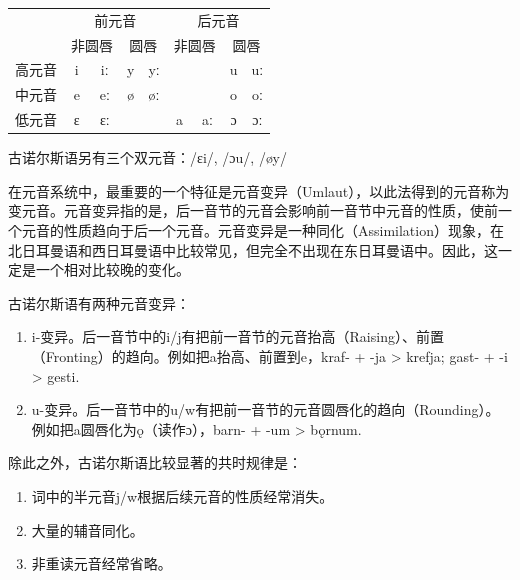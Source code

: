 \begin{table}[H]
    \centering
    \begin{tabular}{@{}ccccccccc@{}}
        \toprule
            & \multicolumn{4}{c}{前元音} & \multicolumn{4}{c}{后元音}                                                                      \\ \cmidrule(l){2-9}
            & \multicolumn{2}{c}{非圆唇} & \multicolumn{2}{c}{圆唇}  & \multicolumn{2}{c}{非圆唇} & \multicolumn{2}{c}{圆唇}                   \\ \cmidrule(l){2-9}
        高元音 & i                       & iː                      & y                       & yː                     &   &    & u & uː \\
        中元音 & e                       & eː                      & ø                       & øː                     &   &    & o & oː \\
        低元音 & ɛ                       & ɛː                      &                         &                        & a & aː & ɔ & ɔː \\ \bottomrule
    \end{tabular}
\end{table}

古诺尔斯语另有三个双元音：/ɛi/, /ɔu/, /øy/

在元音系统中，最重要的一个特征是元音变异（Umlaut），以此法得到的元音称为变元音。元音变异指的是，后一音节的元音会影响前一音节中元音的性质，使前一个元音的性质趋向于后一个元音。元音变异是一种同化（Assimilation）现象，在北日耳曼语和西日耳曼语中比较常见，但完全不出现在东日耳曼语中。因此，这一定是一个相对比较晚的变化。

古诺尔斯语有两种元音变异：
\begin{enumerate}
    \item i-变异。后一音节中的i/j有把前一音节的元音抬高（Raising）、前置（Fronting）的趋向。例如把a抬高、前置到e，kraf- + -ja > krefja; gast- + -i > gesti.

    \item u-变异。后一音节中的u/w有把前一音节的元音圆唇化的趋向（Rounding）。例如把a圆唇化为ǫ（读作ɔ），barn- + -um > bǫrnum.
\end{enumerate}

除此之外，古诺尔斯语比较显著的共时规律是：
\begin{enumerate}
    \item 词中的半元音j/w根据后续元音的性质经常消失。

    \item 大量的辅音同化。

    \item 非重读元音经常省略。
\end{enumerate}

